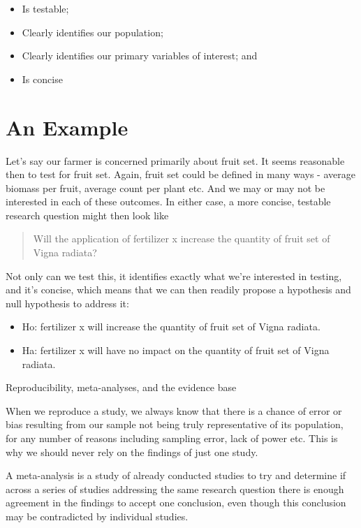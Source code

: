 \documentclass[
]{book}
\providecommand{\tightlist}{%
  \setlength{\itemsep}{0pt}\setlength{\parskip}{0pt}}
\begin{document}
\begin{itemize}
\tightlist
\item
  Is testable;
\item
  Clearly identifies our population;
\item
  Clearly identifies our primary variables of interest; and
\item
  Is concise
\end{itemize}

\hypertarget{an-example}{%
\section*{An Example}\label{an-example}}

Let's say our farmer is concerned primarily about fruit set. It seems reasonable then to test for fruit set. Again, fruit set could be defined in many ways - average biomass per fruit, average count per plant etc. And we may or may not be interested in each of these outcomes. In either case, a more concise, testable research question might then look like

\begin{quote}
Will the application of fertilizer x increase the quantity of fruit set of Vigna radiata?
\end{quote}

Not only can we test this, it identifies exactly what we're interested in testing, and it's concise, which means that we can then readily propose a hypothesis and null hypothesis to address it:

\begin{itemize}
\tightlist
\item
  Ho: fertilizer x will increase the quantity of fruit set of Vigna radiata.
\item
  Ha: fertilizer x will have no impact on the quantity of fruit set of Vigna radiata.
\end{itemize}

Reproducibility, meta-analyses, and the evidence base

When we reproduce a study, we always know that there is a chance of error or bias resulting from our sample not being truly representative of its population, for any number of reasons including sampling error, lack of power etc. This is why we should never rely on the findings of just one study.

A meta-analysis is a study of already conducted studies to try and determine if across a series of studies addressing the same research question there is enough agreement in the findings to accept one conclusion, even though this conclusion may be contradicted by individual studies.
\end{document}
